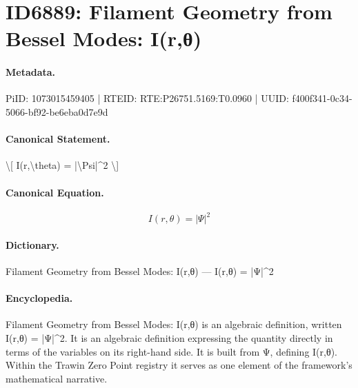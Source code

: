 \section*{ID6889: Filament Geometry from Bessel Modes: I(r,θ)}
\paragraph{Metadata.}
PiID: 1073015459405 | RTEID: RTE:P26751.5169:T0.0960 | UUID: f400f341-0c34-5066-bf92-be6eba0d7e9d

\paragraph{Canonical Statement.}
\textbackslash{}[ I(r,\textbackslash{}theta) = |\textbackslash{}Psi|\textasciicircum{}2 \textbackslash{}]

\paragraph{Canonical Equation.}
\[
I(r,\theta) = |\Psi|^2
\]

\paragraph{Dictionary.}
Filament Geometry from Bessel Modes: I(r,θ) — I(r,θ) = |Ψ|\textasciicircum{}2

\paragraph{Encyclopedia.}
Filament Geometry from Bessel Modes: I(r,θ) is an algebraic definition, written I(r,θ) = |Ψ|\textasciicircum{}2. It is an algebraic definition expressing the quantity directly in terms of the variables on its right-hand side. It is built from Ψ, defining I(r,θ). Within the Trawin Zero Point registry it serves as one element of the framework's mathematical narrative.
